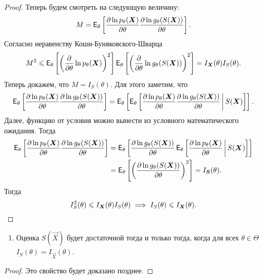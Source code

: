 \begin{proof}
	Теперь будем смотреть на следующую величину:
	\[
		M = \EE_{\theta}\left[\pdv{\ln p_{\theta}(\vec{X})}{\theta}\pdv{\ln g_{\theta}(S(\vec{X}))}{\theta}\right].
	\]
	Согласно неравенству Коши-Буняковского-Шварца
	\[
		M^{2} 
		\leq \EE_{\theta}\left[\left(\pdv{\theta} \ln p_{\theta}(\vec{X})\right)^{2}\right] \EE_{\theta}\left[\left(\pdv{\theta} \ln g_{\theta}(S(\vec{X}))\right)^{2}\right]
		= I_{\vec{X}}(\theta)I_{S}(\theta).
	\]
	Теперь докажем, что $M = I_{S}(\theta)$. Для этого заметим, что
	\[
		\EE_{\theta}\left[\pdv{\ln p_{\theta}(\vec{X})}{\theta} \pdv{\ln g_{\theta}(S(\vec{X}))}{\theta}\right]
		= \EE_{\theta}\left[\EE_{\theta}\left[\pdv{\ln p_{\theta}(\vec{X})}{\theta} \pdv{\ln g_{\theta}(S(\vec{X}))}{\theta}\,\middle|\, S(\vec{X})\right]\right].
	\]
	Далее, функцию от условия можно вынести из условного математического ожидания. Тогда
	\begin{align*}
		\EE_{\theta}\left[\pdv{\ln p_{\theta}(\vec{X})}{\theta} \pdv{\ln g_{\theta}(S(\vec{X}))}{\theta}\right]
		&= \EE_{\theta}\left[\pdv{\ln g_{\theta}(S(\vec{X}))}{\theta} \EE_{\theta}\left[\pdv{\ln p_{\theta}(\vec{X})}{\theta} \,\middle|\, S(\vec{X})\right]\right] \\
		&= \EE_{\theta}\left[\left(\pdv{\ln g_{\theta}(S(\vec{X}))}{\theta}\right)^{2}\right] 
		= I_{\vec{S}}(\theta).
	\end{align*}
	Тогда 
	\[
		I_{S}^{2}(\theta) \leq I_{\vec{X}}(\theta)I_{S}(\theta)
		\implies
		I_{S}(\theta) \leq I_{\vec{X}}(\theta). \qedhere
	\]
\end{proof}
\begin{enumerate}[resume]
	\item Оценка $S(\vec{X})$ будет достаточной тогда и только тогда, когда для всех $\theta \in \Theta$ $I_{S}(\theta) = I_{\vec{X}}(\theta)$.
\end{enumerate}
\begin{proof}
	Это свойство будет доказано позднее.
\end{proof}

